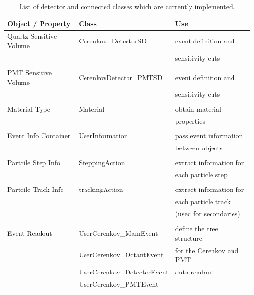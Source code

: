 \begin{table}
\begin{center}
\begin{tabular}{lll}
\hline 
 {\bf Object / Property} &  {\bf Class}                     & {\bf Use}\\
\hline 
 Quartz Sensitive Volume &  Cerenkov\_DetectorSD          & event definition and \\
                         &                                & sensitivity cuts \\
                         &                                & \\
 PMT Sensitive Volume    &  CerenkovDetector\_PMTSD       & event definition and \\
                         &                                & sensitivity cuts \\
                         &                                & \\
 Material Type           &  Material                      & obtain material \\
                         &                                & properties\\
                         &                                & \\
 Event Info Container    &  UserInformation               & pass event information \\
                         &                                & between objects\\
                         &                                & \\
 Partcile Step Info      &  SteppingAction                & extract information for\\ 
                         &                                & each particle step\\ 
                         &                                & \\
 Partcile Track Info     &  trackingAction                & extract information for\\ 
                         &                                & each particle track\\
                         &                                & (used for secondaries)\\ 
                         &                                & \\
 Event Readout           &  UserCerenkov\_MainEvent	  & define the tree structure \\
                         &  UserCerenkov\_OctantEvent	  & for the Cerenkov and PMT\\
                         &  UserCerenkov\_DetectorEvent   & data readout\\
                         &  UserCerenkov\_PMTEvent        & \\
 \hline
\end{tabular}
\end{center}
\caption{List of detector and connected classes which 
         are currently implemented.}
\label{tbl:V-I}
\end{table}

